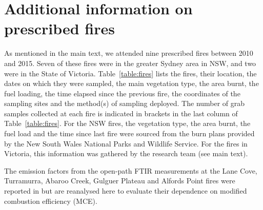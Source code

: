 \documentclass[acp, manuscript]{copernicus}
\begin{document}
\section{Additional information on prescribed fires}
As mentioned in the main text, we attended nine prescribed fires between 2010 and 2015. Seven of these fires were in the greater Sydney area in NSW, and two were in the State of Victoria. Table~\ref{table:fires} lists the fires, their location, the dates on which they were sampled, the main vegetation type, the area burnt, the fuel loading, the time elapsed since the previous fire, the coordinates of the sampling sites and the method(s) of sampling deployed. The number of grab samples collected at each fire is indicated in brackets in the last column of Table~\ref{table:fires}. For the NSW fires, the vegetation type, the area burnt, the fuel load and the time since last fire were sourced from the burn plans provided by the New South Wales National Parks and Wildlife Service. For the fires in Victoria, this information was gathered by the research team (see main text). 

The emission factors from the open-path FTIR measurements at the Lane Cove, Turramurra, Abaroo Creek, Gulguer Plateau and Alfords Point fires were reported in \citet{Paton-Walsh2014} but are reanalysed here to evaluate their dependence on modified combustion efficiency (MCE).   
\end{document}
